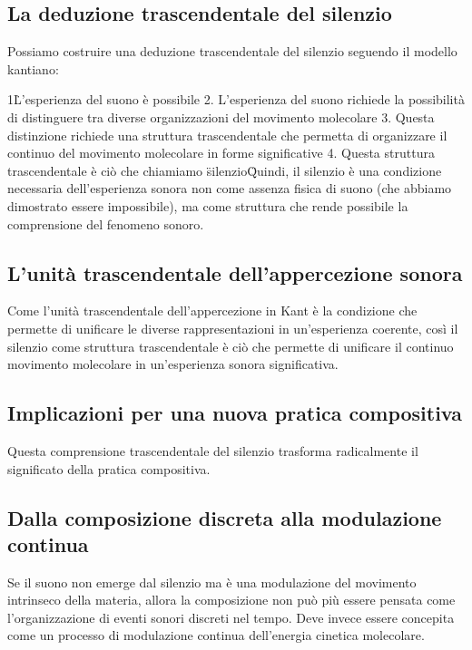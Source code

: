 \documentclass[a4paper,11pt]{article}
\begin{document}
\subsection{La deduzione trascendentale del silenzio}

Possiamo costruire una deduzione trascendentale del silenzio seguendo il
modello kantiano:

1\. L'esperienza del suono è possibile 2. L'esperienza del suono
richiede la possibilità di distinguere tra diverse organizzazioni del
movimento molecolare 3. Questa distinzione richiede una struttura
trascendentale che permetta di organizzare il continuo del movimento
molecolare in forme significative 4. Questa struttura trascendentale è
ciò che chiamiamo \"silenzio\"

Quindi, il silenzio è una condizione necessaria dell'esperienza sonora
non come assenza fisica di suono (che abbiamo dimostrato essere
impossibile), ma come struttura che rende possibile la comprensione del
fenomeno sonoro.

\subsection{L'unità trascendentale dell'appercezione sonora}

Come l'unità trascendentale dell'appercezione in Kant è la condizione
che permette di unificare le diverse rappresentazioni in un'esperienza
coerente, così il silenzio come struttura trascendentale è ciò che
permette di unificare il continuo movimento molecolare in un'esperienza
sonora significativa.

\subsection{Implicazioni per una nuova pratica compositiva}

Questa comprensione trascendentale del silenzio trasforma radicalmente
il significato della pratica compositiva.

\subsection{Dalla composizione discreta alla modulazione continua}

Se il suono non emerge dal silenzio ma è una modulazione del movimento
intrinseco della materia, allora la composizione non può più essere
pensata come l'organizzazione di eventi sonori discreti nel tempo. Deve
invece essere concepita come un processo di modulazione continua
dell'energia cinetica molecolare.
\end{document}
